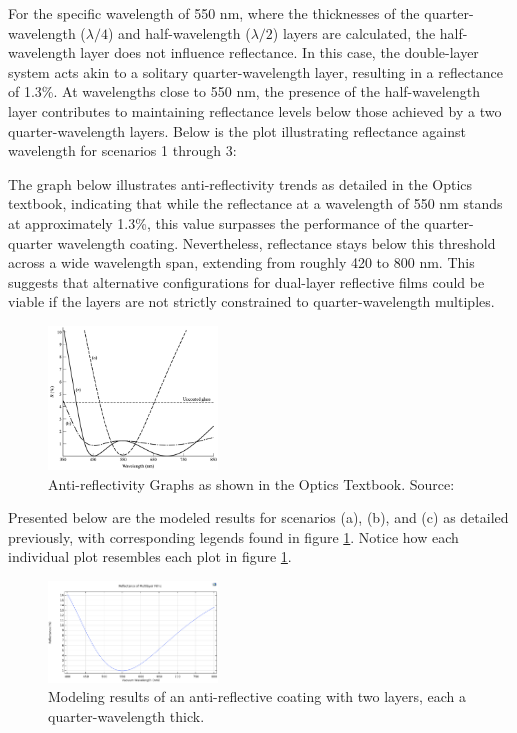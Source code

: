 For the specific wavelength of 550 nm, where the thicknesses of the quarter-wavelength ($\lambda/4$) and half-wavelength ($\lambda/2$) layers are calculated, the half-wavelength layer does not influence reflectance. In this case, the double-layer system acts akin to a solitary quarter-wavelength layer, resulting in a reflectance of 1.3\%. At wavelengths close to 550 nm, the presence of the half-wavelength layer contributes to maintaining reflectance levels below those achieved by a two quarter-wavelength layers. Below is the plot illustrating reflectance against wavelength for scenarios 1 through 3:

The graph below illustrates anti-reflectivity trends as detailed in the Optics textbook, indicating that while the reflectance at a wavelength of 550 nm stands at approximately 1.3\%, this value surpasses the performance of the quarter-quarter wavelength coating. Nevertheless, reflectance stays below this threshold across a wide wavelength span, extending from roughly 420 to 800 nm. This suggests that alternative configurations for dual-layer reflective films could be viable if the layers are not strictly constrained to quarter-wavelength multiples.

\begin{figure}[ht!]
  \centering
  \includegraphics[width=0.4\textwidth]{Chapters/Figures/Chapter 4 Figures/Antireflectivity Graphs in the Optics Book.png}
  \caption{Anti-reflectivity Graphs as shown in the Optics Textbook. Source: \cite{pedrotti_introduction_2007}}
  \label{fig:antireflectivity graphs in the Optics book}
\end{figure}

Presented below are the modeled results for scenarios (a), (b), and (c) as detailed previously, with corresponding legends found in figure \ref{fig:antireflectivity graphs in the Optics book}. Notice how each individual plot resembles each plot in figure \ref{fig:antireflectivity graphs in the Optics book}.

\begin{figure}[ht!]
  \centering
  \includegraphics[width=0.4\textwidth]{Chapters/Figures/Chapter 4 Figures/Antireflective Figure a.png}
  \caption{Modeling results of an anti-reflective coating with two layers, each a quarter-wavelength thick.}
  \label{fig:Antireflective Figure a}
\end{figure}

